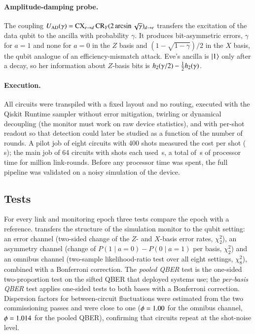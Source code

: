 \paragraph{Amplitude-damping probe.} The coupling $U_{\rm AD}(\gamma)=\mathrm{CX}_{e\to d}\,\mathrm{CR}_Y(2\arcsin\sqrt\gamma)_{d\to e}$ transfers the excitation of the data qubit to the ancilla with probability $\gamma$. It produces bit-asymmetric errors, $\gamma$ for $a=1$ and none for $a=0$ in the $Z$ basis and $(1-\sqrt{1-\gamma})/2$ in the $X$ basis, the qubit analogue of an efficiency-mismatch attack. Eve's ancilla is $\lvert 1\rangle$ only after a decay, so her information about $Z$-basis bits is $h_2(\gamma/2)-\tfrac12h_2(\gamma)$.

\paragraph{Execution.} All circuits were transpiled with a fixed layout and no routing, executed with the Qiskit Runtime sampler \cite{Qiskit2024} without error mitigation, twirling or dynamical decoupling (the monitor must work on raw device statistics), and with per-shot readout so that detection could later be studied as a function of the number of rounds. A pilot job of eight circuits with 400 shots measured the cost per shot (\HwPilotSec\,s); the main job of 64 circuits with \HwShots{} shots each used \HwMainSec\,s, a total of \HwTotalSec\,s of processor time for \HwRounds{} million link-rounds. Before any processor time was spent, the full pipeline was validated on a noisy simulation of the device.

\subsection{Tests}\label{sec:hw-tests}

For every link and monitoring epoch three tests compare the epoch with a reference. \emph{\qtrace{}} transfers the structure of the simulation monitor to the qubit setting: an error channel (two-sided change of the $Z$- and $X$-basis error rates, $\chi^2_2$), an asymmetry channel (change of $P(1\mid a=0)-P(0\mid a=1)$ per basis, $\chi^2_2$) and an omnibus channel (two-sample likelihood-ratio test over all eight settings, $\chi^2_8$), combined with a Bonferroni correction. The \emph{pooled QBER} test is the one-sided two-proportion test on the sifted QBER that deployed systems use; the \emph{per-basis QBER} test applies one-sided tests to both bases with a Bonferroni correction. Dispersion factors for between-circuit fluctuations were estimated from the two commissioning passes and were close to one ($\phi=1.00$ for the omnibus channel, $\phi=1.014$ for the pooled QBER), confirming that circuits repeat at the shot-noise level.

